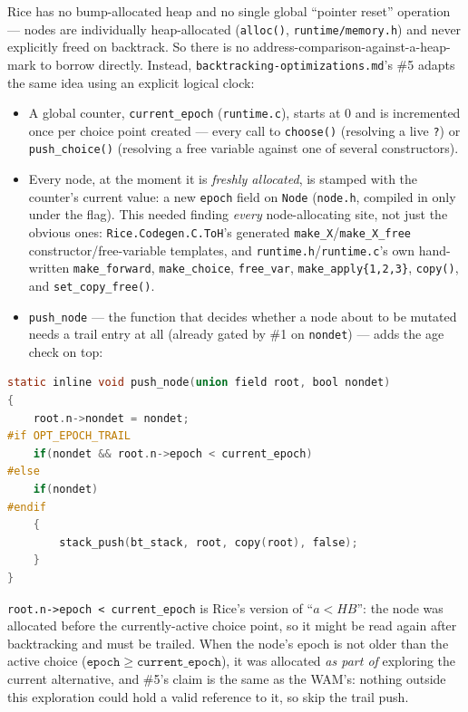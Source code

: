 \documentclass[11pt]{article}
\newcommand{\btomd}{\texttt{backtracking-\allowbreak optimizations.md}\xspace}
\begin{document}
Rice has no bump-allocated heap and no single global ``pointer reset''
operation --- nodes are individually heap-allocated (\texttt{alloc()},
\texttt{runtime/memory.h}) and never explicitly freed on backtrack. So
there is no address-comparison-against-a-heap-mark to borrow directly.
Instead, \btomd's \#5 adapts the same idea
using an explicit logical clock:

\begin{itemize}
  \item A global counter, \texttt{current\_epoch} (\texttt{runtime.c}),
    starts at 0 and is incremented once per choice point created ---
    every call to \texttt{choose()} (resolving a live \texttt{?}) or
    \texttt{push\_choice()} (resolving a free variable against one of
    several constructors).
  \item Every node, at the moment it is \emph{freshly allocated}, is
    stamped with the counter's current value: a new \texttt{epoch} field
    on \texttt{Node} (\texttt{node.h}, compiled in only under the flag).
    This needed finding \emph{every} node-allocating site, not just the
    obvious ones: \texttt{Rice.Codegen.C.ToH}'s generated
    \texttt{make\_X}/\texttt{make\_X\_free} constructor/free-variable
    templates, and \texttt{runtime.h}/\texttt{runtime.c}'s own
    hand-written \texttt{make\_forward}, \texttt{make\_choice},
    \texttt{free\_var}, \texttt{make\_apply\{1,2,3\}}, \texttt{copy()},
    and \texttt{set\_copy\_free()}.
  \item \texttt{push\_node} --- the function that decides whether a node
    about to be mutated needs a trail entry at all (already gated by \#1
    on \texttt{nondet}) --- adds the age check on top:
\end{itemize}

\begin{lstlisting}[language=C]
static inline void push_node(union field root, bool nondet)
{
    root.n->nondet = nondet;
#if OPT_EPOCH_TRAIL
    if(nondet && root.n->epoch < current_epoch)
#else
    if(nondet)
#endif
    {
        stack_push(bt_stack, root, copy(root), false);
    }
}
\end{lstlisting}

\texttt{root.n->epoch < current\_epoch} is Rice's version of ``$a <
\mathit{HB}$'': the node was allocated before the currently-active choice
point, so it might be read again after backtracking and must be trailed.
When the node's epoch is not older than the active choice
($\mathtt{epoch} \ge \mathtt{current\_epoch}$), it was allocated \emph{as
part of} exploring the current alternative, and \#5's claim is the same
as the WAM's: nothing outside this exploration could hold a valid
reference to it, so skip the trail push.
\end{document}
